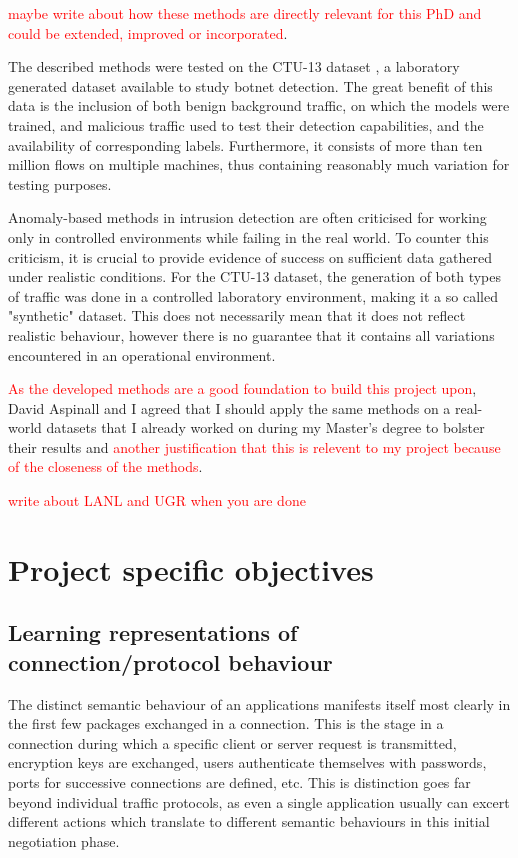 \documentclass[a4paper,12pt,twoside]{report}
\begin{document}
\textcolor{red}{maybe write about how these methods are directly relevant for this PhD and could be extended, improved or incorporated}.

The described methods were tested on the CTU-13 dataset \cite{garcia2014empirical}, a laboratory generated dataset available to study botnet detection. The great benefit of this data is the inclusion of both benign background traffic, on which the models were trained, and malicious traffic used to test their detection capabilities, and the availability of corresponding labels. Furthermore, it consists of more than ten million flows on multiple machines, thus containing reasonably much variation for testing purposes.

Anomaly-based methods in intrusion detection are often criticised for working only in controlled environments while failing in the real world. To counter this criticism, it is crucial to provide evidence of success on sufficient data gathered under realistic conditions. For the CTU-13 dataset, the generation of both types of traffic was done in a controlled laboratory environment, making it a so called "synthetic" dataset. This does not necessarily mean that it does not reflect realistic behaviour, however there is no guarantee that it contains all variations encountered in an operational environment. 

\textcolor{red}{As the developed methods are a good foundation to build this project upon}, David Aspinall and I agreed that I should apply the same methods on a real-world datasets that I already worked on during my Master's degree to bolster their results and \textcolor{red}{another justification that this is relevent to my project because of the closeness of the methods}. 

\textcolor{red}{write about LANL and UGR when you are done}

\chapter{Project specific objectives}


\section{Learning representations of connection/protocol behaviour}\label{Repr}

The distinct semantic behaviour of an applications manifests itself most clearly in the first few packages exchanged in a connection. This is the stage in a connection during which a specific client or server request is transmitted, encryption keys are exchanged, users authenticate themselves with passwords, ports for successive connections are defined, etc. This is distinction goes far beyond individual traffic protocols, as even a single application usually can excert different actions which translate to different semantic behaviours in this initial negotiation phase. 
\end{document}
